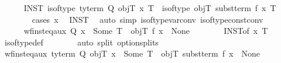 \begin{isabellebody}
%
\endisadelimproof
\isanewline
\ \ \ \ \isamarkupfalse%
\ INST{\isacharprime}{\kern0pt}{\isacharcolon}{\kern0pt}\ {\isachardoublequoteopen}is{\isacharunderscore}{\kern0pt}of{\isacharunderscore}{\kern0pt}type\ {\isacharparenleft}{\kern0pt}ty{\isacharunderscore}{\kern0pt}term\ Q\ objT{\isacharparenright}{\kern0pt}\ x\ T\ {\isasymLongrightarrow}\ is{\isacharunderscore}{\kern0pt}of{\isacharunderscore}{\kern0pt}type\ objT\ {\isacharparenleft}{\kern0pt}subst{\isacharunderscore}{\kern0pt}term\ f\ x{\isacharparenright}{\kern0pt}\ T{\isachardoublequoteclose}\isanewline
%
\isadelimproof
\ \ \ \ \ \ %
\endisadelimproof
%
\isatagproof
{}\isamarkupfalse%
\ {\isacharparenleft}{\kern0pt}cases\ x{\isacharparenright}{\kern0pt}\ \isamarkupfalse%
\ INST\ \isamarkupfalse%
\ {\isacharparenleft}{\kern0pt}auto\ simp{\isacharcolon}{\kern0pt}\ is{\isacharunderscore}{\kern0pt}of{\isacharunderscore}{\kern0pt}type{\isacharunderscore}{\kern0pt}var{\isacharunderscore}{\kern0pt}conv\ is{\isacharunderscore}{\kern0pt}of{\isacharunderscore}{\kern0pt}type{\isacharunderscore}{\kern0pt}const{\isacharunderscore}{\kern0pt}conv{\isacharparenright}{\kern0pt}\isanewline
\ \ \ \ \ \ \isamarkupfalse%
%
\endisatagproof
{\isafoldproof}%
%
\isadelimproof
\isanewline
%
\endisadelimproof
\isanewline
\isanewline
\ \ \ \ \isamarkupfalse%
\ wf{\isacharunderscore}{\kern0pt}inst{\isacharunderscore}{\kern0pt}eq{\isacharunderscore}{\kern0pt}aux{\isacharcolon}{\kern0pt}\ {\isachardoublequoteopen}Q\ x\ {\isacharequal}{\kern0pt}\ Some\ T\ {\isasymLongrightarrow}\ objT\ {\isacharparenleft}{\kern0pt}f\ x{\isacharparenright}{\kern0pt}\ {\isasymnoteq}\ None{\isachardoublequoteclose}\isanewline
%
\isadelimproof
\ \ \ \ \ \ %
\endisadelimproof
%
\isatagproof
{}\isamarkupfalse%
\ INST{\isacharbrackleft}{\kern0pt}of\ x\ T{\isacharbrackright}{\kern0pt}\ \isamarkupfalse%
\ is{\isacharunderscore}{\kern0pt}of{\isacharunderscore}{\kern0pt}type{\isacharunderscore}{\kern0pt}def\isanewline
\ \ \ \ \ \ \isamarkupfalse%
\ {\isacharparenleft}{\kern0pt}auto\ split{\isacharcolon}{\kern0pt}\ option{\isachardot}{\kern0pt}splits{\isacharparenright}{\kern0pt}%
\endisatagproof
{\isafoldproof}%
%
\isadelimproof
\isanewline
%
\endisadelimproof
\isanewline
\ \ \ \ \isamarkupfalse%
\ wf{\isacharunderscore}{\kern0pt}inst{\isacharunderscore}{\kern0pt}eq{\isacharunderscore}{\kern0pt}aux{\isacharprime}{\kern0pt}{\isacharcolon}{\kern0pt}\ {\isachardoublequoteopen}ty{\isacharunderscore}{\kern0pt}term\ Q\ objT\ x\ {\isacharequal}{\kern0pt}\ Some\ T\ {\isasymLongrightarrow}\ objT\ {\isacharparenleft}{\kern0pt}subst{\isacharunderscore}{\kern0pt}term\ f\ x{\isacharparenright}{\kern0pt}\ {\isasymnoteq}\ None{\isachardoublequoteclose}\isanewline

\end{isabellebody}
